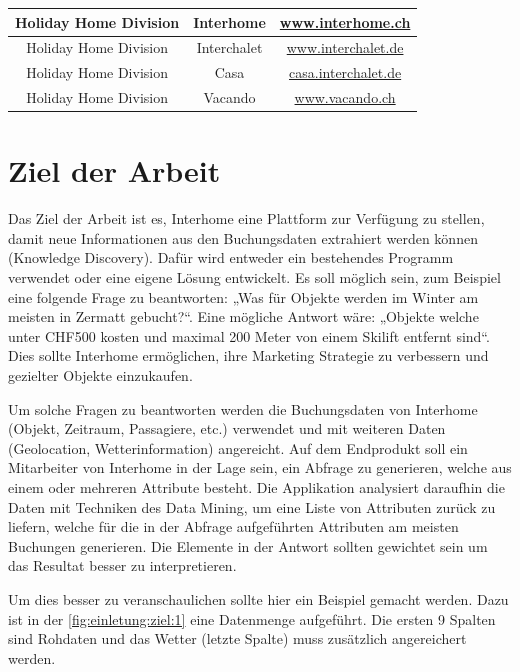 \begin{table}[h]
\begin{tabular}{ | c | c | c |}
		Holiday Home Division & Interhome & \href{http://www.interhome.ch}{www.interhome.ch} \\ \hline 
		Holiday Home Division & Interchalet & \href{http://www.interchalet.de}{www.interchalet.de} \\ \hline 
		Holiday Home Division & Casa & \href{http://casa.interchalet.de}{casa.interchalet.de} \\ \hline 
		Holiday Home Division & Vacando & \href{http://www.vacando.ch}{www.vacando.ch} \\ \hline 
	\end{tabular}
\end{table}

\section{Ziel der Arbeit}
\label{sec:einleitung:ziel}
Das Ziel der Arbeit ist es, Interhome eine Plattform zur Verfügung zu stellen, damit neue Informationen aus den Buchungsdaten extrahiert werden können (Knowledge Discovery). Dafür wird entweder ein bestehendes Programm verwendet oder eine eigene Lösung entwickelt. Es soll möglich sein, zum Beispiel eine folgende Frage zu beantworten: „Was für Objekte werden im Winter am meisten in Zermatt gebucht?“. Eine mögliche Antwort wäre: „Objekte welche unter CHF500 kosten und maximal 200 Meter von einem Skilift entfernt sind“.
Dies sollte Interhome ermöglichen, ihre Marketing Strategie zu verbessern und gezielter Objekte einzukaufen.

Um solche Fragen zu beantworten werden die Buchungsdaten von Interhome (Objekt, Zeitraum, Passagiere, etc.) verwendet und mit weiteren Daten (Geolocation, Wetterinformation) angereicht. 
Auf dem Endprodukt soll ein Mitarbeiter von Interhome in der Lage sein, ein Abfrage zu generieren, welche aus einem oder mehreren Attribute besteht. Die Applikation analysiert daraufhin die Daten mit Techniken des Data Mining, um eine Liste von Attributen zurück zu liefern, welche für die in der Abfrage aufgeführten Attributen am meisten Buchungen generieren. Die Elemente in der Antwort sollten gewichtet sein um das Resultat besser zu interpretieren.

Um dies besser zu veranschaulichen sollte hier ein Beispiel gemacht werden. Dazu ist in der \cref{fig:einletung:ziel:1} eine Datenmenge aufgeführt. Die ersten 9 Spalten sind Rohdaten und das Wetter (letzte Spalte) muss zusätzlich angereichert werden.

